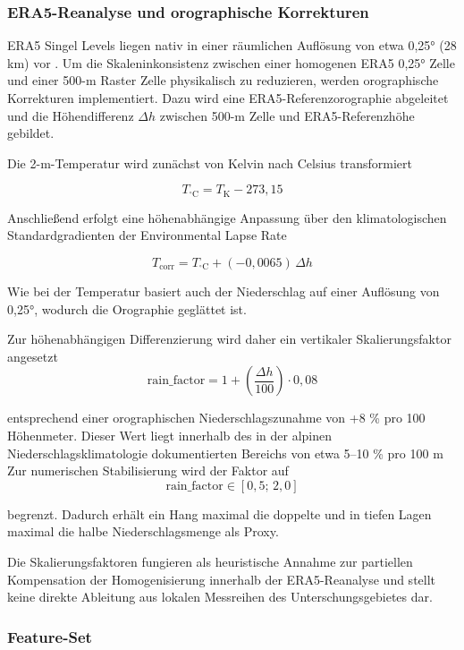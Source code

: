 \documentclass[../main.tex]{subfiles}
\begin{document}
\subsubsection{ERA5-Reanalyse und orographische Korrekturen}

ERA5 Singel Levels liegen nativ in einer räumlichen Auflösung von etwa 0,25° (28 km) vor \autocite{ERA5HourlyData}. Um die Skaleninkonsistenz zwischen einer homogenen ERA5 0,25° Zelle und einer 500-m Raster Zelle physikalisch zu reduzieren, werden orographische Korrekturen implementiert. Dazu wird eine ERA5-Referenzorographie abgeleitet und die Höhendifferenz \(\Delta h\) zwischen 500-m Zelle und ERA5-Referenzhöhe gebildet.

Die 2-m-Temperatur wird zunächst von Kelvin nach Celsius transformiert

\[T_{^\circ\mathrm{C}} = T_{\mathrm{K}} - 273{,}15\]

Anschließend erfolgt eine höhenabhängige Anpassung über den klimatologischen Standardgradienten der Environmental Lapse Rate

\[T_{\mathrm{corr}} = T_{^\circ\mathrm{C}} + (-0{,}0065)\, \Delta h
\]

Wie bei der Temperatur basiert auch der Niederschlag auf einer Auflösung von 0,25°, wodurch die Orographie geglättet ist.

Zur höhenabhängigen Differenzierung wird daher ein vertikaler Skalierungsfaktor angesetzt
\[
    \mathrm{rain\_factor} = 1 + \left(\frac{\Delta h}{100}\right)\cdot 0{,}08
\]



entsprechend einer orographischen Niederschlagszunahme von +8 \% pro 100 Höhenmeter. Dieser Wert liegt innerhalb des in der alpinen Niederschlagsklimatologie dokumentierten Bereichs von etwa 5–10 \% pro 100 m \autocite{freiPrecipitationClimatologyAlps1998, sevrukRegionalDependencyPrecipitationAltitude1997}
Zur numerischen Stabilisierung wird der Faktor auf
\[
    \mathrm{rain\_factor} \in [0{,}5;\,2{,}0]
\]

begrenzt.
Dadurch erhält ein Hang maximal die doppelte und in tiefen Lagen maximal die halbe Niederschlagsmenge als Proxy.

Die Skalierungsfaktoren fungieren als heuristische Annahme zur partiellen Kompensation der Homogenisierung innerhalb der ERA5-Reanalyse und stellt keine direkte Ableitung aus lokalen Messreihen des Unterschungsgebietes dar.



\subsubsection{Feature-Set}
\end{document}
